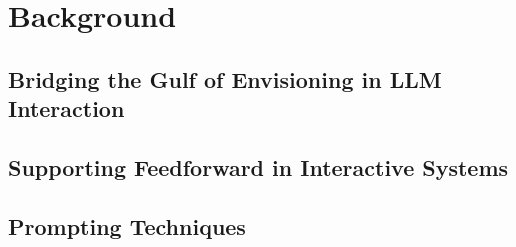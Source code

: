 \section{Background}
\label{section:background}

\subsection{Bridging the Gulf of Envisioning in LLM Interaction}





\subsection{Supporting Feedforward in Interactive Systems}


\subsection{Prompting Techniques}


